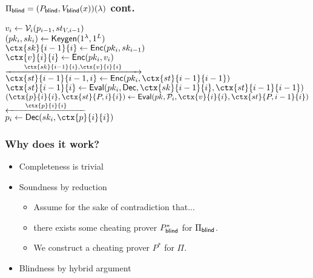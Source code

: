 \documentclass{beamer}
\begin{document}
\begin{frame}
	\frametitle{$\Pi_{\mathsf{blind}}=(P_{\mathsf{blind}}, V_{\mathsf{blind}}(x))(\lambda)$ cont.}
	$v_i\leftarrow\mathcal{V}_i(p_{i-1}, st_{V, i-1})$
	\pause
	\\$(pk_i, sk_i)\leftarrow\mathsf{Keygen}(1^\lambda, 1^L)$
	\pause
	\\$\ctx{sk}{i-1}{i}\leftarrow\Enc(pk_i, sk_{i-1})$
	\pause
	\\$\ctx{v}{i}{i}\leftarrow\Enc(pk_i, v_i)$
	\pause
	\\\hspace*{\fill}$\xrightarrow{\qquad \ctx{sk}{i-1}{i}, \ctx{v}{i}{i}\qquad}$\hspace*{\fill}
	\pause
	\\\hspace*{\fill}$\ctx{st}{i-1}{i-1, i}\leftarrow\Enc(pk_i, \ctx{st}{i-1}{i-1})$
	\pause
	\\\hspace*{\fill}$\ctx{st}{i-1}{i}\leftarrow\Eval(pk_i, \Dec, \ctx{sk}{i-1}{i}, \ctx{st}{i-1}{i-1})$
	\pause
	\\\hspace*{\fill}$(\ctx{p}{i}{i}, \ctx{st}{P, i}{i})\leftarrow\Eval(pk, \cP_i, \ctx{v}{i}{i}, \ctx{st}{P, i-1}{i})$
	\pause
	\\\hspace*{\fill}$\xleftarrow{\qquad \ctx{p}{i}{i}\qquad}$\hspace*{\fill}
	\pause
	\\$p_i\leftarrow\Dec(sk_i, \ctx{p}{i}{i})$
\end{frame}

\begin{frame}
	\frametitle{Why does it work?}
	\begin{itemize}[<+->]
		\item Completeness is trivial
		\item Soundness by reduction
			\begin{itemize}[<+->]
				\item Assume for the sake of contradiction that...
				\item there exists some cheating prover $P_{\mathsf{blind}}^*$ for $\Pi_{\mathsf{blind}}$.
				\item We construct a cheating prover $P^*$ for $\Pi$.
			\end{itemize}
		\item Blindness by hybrid argument
	\end{itemize}
\end{frame}
\end{document}
